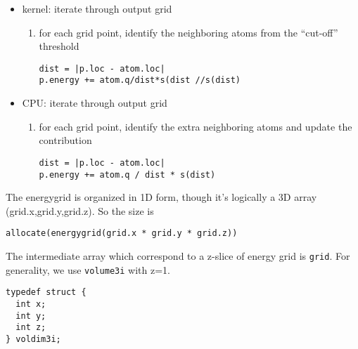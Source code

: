 \begin{enumerate}
  \begin{itemize}
  \item kernel: iterate through output grid
    \begin{enumerate}
    \item for each grid point, identify the neighboring atoms from the
      ``cut-off'' threshold
\begin{verbatim}
dist = |p.loc - atom.loc|
p.energy += atom.q/dist*s(dist //s(dist)
\end{verbatim}
    \end{enumerate}
  \item CPU: iterate through output grid
    \begin{enumerate}
    \item for each grid point, identify the extra neighboring atoms and
      update the contribution
\begin{verbatim}
dist = |p.loc - atom.loc|
p.energy += atom.q / dist * s(dist)
\end{verbatim}
    \end{enumerate}
    
  \end{itemize}
\end{enumerate}


The energygrid is organized in 1D form, though it's logically a 3D
array (grid.x,grid.y,grid.z). So the size is 
\begin{lstlisting}
allocate(energygrid(grid.x * grid.y * grid.z))
\end{lstlisting}

The intermediate array which correspond to a z-slice of energy grid is
\verb!grid!. For generality, we use \verb!volume3i! with z=1.
\begin{lstlisting}
typedef struct {
  int x;
  int y;
  int z;
} voldim3i;
\end{lstlisting}

